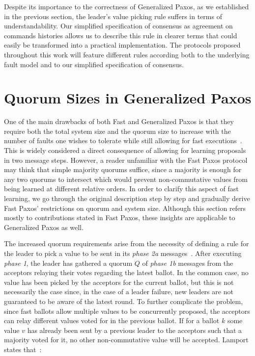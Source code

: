 Despite its importance to the correctness of Generalized Paxos, as we established in the previous section, the leader's value picking rule suffers in terms of understandability. Our simplified specification of consensus as agreement on commands histories allows us to describe this rule in clearer terms that could easily be transformed into a practical implementation. The protocols proposed throughout this work will feature different rules according both to the underlying fault model and to our simplified specification of consensus.

\section{Quorum Sizes in Generalized Paxos} 
One of the main drawbacks of both Fast and Generalized Paxos is that they require both the total system size and the quorum size to increase with the number of faults one wishes to tolerate while still allowing for fast executions~\cite{Lamport2006,Lamport2005}. This is widely considered a direct consequence of allowing for learning proposals in two message steps. However, a reader unfamiliar with the Fast Paxos protocol may think that simple majority quorums suffice, since a majority is enough for any two quorums to intersect which would prevent non-commutative values from being learned at different relative orders. In order to clarify this aspect of fast learning, we go through the original description step by step and gradually derive Fast Paxos' restrictions on quorum and system size. Although this section refers mostly to contributions stated in Fast Paxos, these insights are applicable to Generalized Paxos as well.\par
The increased quorum requirements arise from the necessity of defining a rule for the leader to pick a value to be sent in its \textit{phase 2a} messages~\cite{Lamport2006}. After executing \textit{phase 1}, the leader has gathered a quorum $Q$ of \textit{phase 1b} messages from the acceptors relaying their votes regarding the latest ballot. In the common case, no value has been picked by the acceptors for the current ballot, but this is not necessarily the case since, in the case of a leader failure, new leaders are not guaranteed to be aware of the latest round. To further complicate the problem, since fast ballots allow multiple values to be concurrently proposed, the acceptors can relay different values voted for in the previous ballot. If for a ballot $k$ some value $v$ has already been sent by a previous leader to the acceptors such that a majority voted for it, no other non-commutative value will be accepted. Lamport states that~\cite{Lamport2006}:\par

